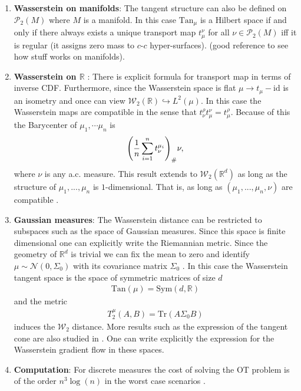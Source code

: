 \documentclass[
    a4paper,
    DIV=14,
    abstract=true,
    numbers=noenddot
]
{scrartcl}
\theoremstyle{definition}
\newcommand{\rmm}[1]{\mathrm{#1}}
\newcommand{\R}{\mathbb{R}}
\newcommand{\Nn}{\mathcal{N}}
\newcommand{\Pp}{\mathcal{P}}
\newcommand{\Ww}{\mathcal{W}}
\begin{document}
\begin{enumerate}
\item \textbf{Wasserstein on manifolds}:  The tangent structure can also be defined on $\Pp _2 (M)$ where $M$ is a manifold. In this case $\rmm{Tan}_\mu $ is a Hilbert space if and only if there always exists a unique transport map $t_\mu ^\nu$ for all $\nu \in \Pp _2(M)$ iff it is regular (it assigns zero mass to $c$-$c$   hyper-surfaces). \cite[Proposition 2.4, Corollary 2.6]{gigli2011inverse} (good reference to see how stuff works on manifolds). 

\item \textbf{Wasserstein on $\R$ }: There is explicit formula for transport map in terms of inverse CDF. Furthermore, since the Wasserstein space is flat $\mu \to t_\mu - \rmm{id}$ is an isometry and once can view $\Ww _2(\R) \hookrightarrow L^2(\mu )$. In this case the Wasserstein maps are compatible in the sense that $t_\nu ^\rho t_\mu ^\nu = t_\mu ^\rho$. Because of this the Barycenter of $\mu _1, \cdots \mu _n$ is  
\begin{align*}
    \qty(\frac{1}{n}\sum_{i=1}^n t_\nu ^{\mu _i})_{\#} \nu, 
\end{align*}
where $\nu$ is any a.c. measure. This result extends to $\Ww_2(\R^d)$ as long as the structure of $\mu_1,..., \mu _n$ is $1$-dimensional. That is, as long as $(\mu_1,..., \mu _n,\nu)$ are compatible   \cite[Theorem 4.1]{boissard2015distribution}. 


\item \textbf{Gaussian measures}: The Wasserstein distance can be restricted to subspaces such as the space of Gaussian measures. Since this space is finite dimensional one can explicitly write the Riemannian metric. Since the geometry of $\R^d$ is trivial we can fix the mean to zero and identify $\mu \sim \Nn (0, \Sigma _0) $ with its covariance matrix $\Sigma_0$  . In this case the Wasserstein tangent space is  the space of symmetric matrices of size $d$ 
\begin{align*}
    \rmm{Tan}(\mu )= \rmm{Sym}(d,\R)
\end{align*}
and the metric 
\begin{align*}
    T_2^\mu (A,B)= \rmm{Tr}(A\Sigma_0 B)
\end{align*}
induces the $\Ww_2$ distance. More results such as the expression of the tangent cone are also studied in \cite{takatsu2011wasserstein}. One can write explicitly the expression for the Wasserstein gradient flow in these spaces.

\item \textbf{Computation}: For discrete measures the cost of solving the OT problem is of the order $n^3 \log(n)$ in the worst case scenarios \cite[Section 5]{panaretos2019statistical}.
 

\end{enumerate}
\end{document}
